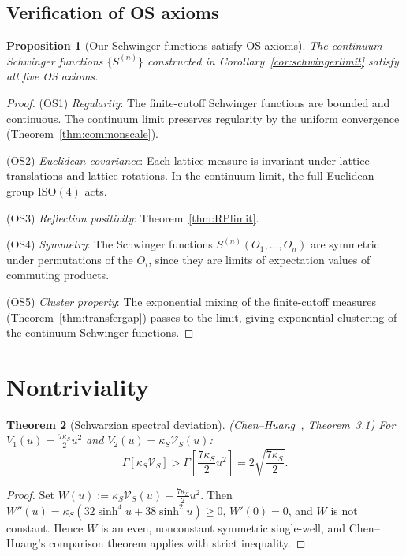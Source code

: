 \documentclass[12pt]{article}
\theoremstyle{plain}
\newtheorem{theorem}{Theorem}[section]
\newtheorem{proposition}[theorem]{Proposition}
\theoremstyle{definition}
\numberwithin{equation}{section}
\begin{document}
\subsection{Verification of OS axioms}

\begin{proposition}[Our Schwinger functions satisfy OS axioms]\label{prop:OSverify}
The continuum Schwinger functions $\{S^{(n)}\}$ constructed in Corollary~\ref{cor:schwingerlimit} satisfy all five OS axioms.
\end{proposition}

\begin{proof}
(OS1) \emph{Regularity}: The finite-cutoff Schwinger functions are bounded and continuous.  The continuum limit preserves regularity by the uniform convergence (Theorem~\ref{thm:commonscale}).

(OS2) \emph{Euclidean covariance}: Each lattice measure is invariant under lattice translations and lattice rotations.  In the continuum limit, the full Euclidean group $\mathrm{ISO}(4)$ acts.

(OS3) \emph{Reflection positivity}: Theorem~\ref{thm:RPlimit}.

(OS4) \emph{Symmetry}: The Schwinger functions $S^{(n)}(O_1,\ldots,O_n)$ are symmetric under permutations of the $O_i$, since they are limits of expectation values of commuting products.

(OS5) \emph{Cluster property}: The exponential mixing of the finite-cutoff measures (Theorem~\ref{thm:transfergap}) passes to the limit, giving exponential clustering of the continuum Schwinger functions.
\end{proof}

\section{Nontriviality}\label{sec:nontriviality}

\begin{theorem}[Schwarzian spectral deviation]\label{thm:spectraldeviation}
(Chen--Huang~\cite{ChenHuang2012}, Theorem~3.1)
For $V_1(u)=\frac{7\kappa_S}{2}u^2$ and $V_2(u)=\kappa_S\mathcal{V}_S(u)$:
\begin{equation}
\Gamma[\kappa_S\mathcal{V}_S] > \Gamma\!\left[\frac{7\kappa_S}{2}u^2\right] = 2\sqrt{\frac{7\kappa_S}{2}}.
\end{equation}
\end{theorem}

\begin{proof}
Set $W(u):=\kappa_S\mathcal{V}_S(u)-\frac{7\kappa_S}{2}u^2$.  Then $W''(u)=\kappa_S(32\sinh^4 u+38\sinh^2 u)\geq 0$, $W'(0)=0$, and $W$ is not constant.  Hence $W$ is an even, nonconstant symmetric single-well, and Chen--Huang's comparison theorem applies with strict inequality.
\end{proof}
\end{document}
